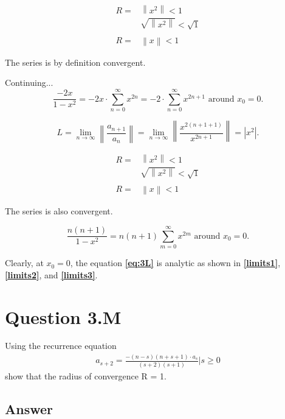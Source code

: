 \documentclass{article}
\begin{document}
\begin{align*}
R =& \left\|x^2\right\| < 1 \\
& \sqrt{\left\|x^2\right\|} < \sqrt{1}\\
\\
R =& \left\|x\right\| < 1
\end{align*}

The series is by definition convergent.

Continuing...
\begin{equation*}
\frac{-2x}{1-x^2} = -2x\cdot \sum_{n=0}^{\infty} {x^{2n}} = -2\cdot \sum_{n=0}^{\infty} {x^{2n+1}} \text{  around } x_0=0.
\end{equation*}

\begin{equation}\label{limits2}
L = \lim_{n\to\infty} \left\| \frac{a_{n+1}}{a_n} \right\| = \lim_{n\to\infty}\left\|\frac{x^{2(n+1+1)}}{x^{2n+1}}\right\| = \left|x^2\right|.
\end{equation}
    
\begin{align*}
R =& \left\|x^2\right\| < 1 \\
& \sqrt{\left\|x^2\right\|} < \sqrt{1}\\
\\
R =& \left\|x\right\| < 1
\end{align*}

The series is also convergent.

\begin{equation}\label{limits3}
\frac{n(n+1)}{1-x^2} = n(n+1) \sum_{m=0}^{\infty} x^{2m} \text{  around } x_0=0.
\end{equation}

Clearly, at $x_0 = 0$, the equation \textbf{\ref{eq:3L}} is analytic as shown in \textbf{\ref{limits1}}, \textbf{\ref{limits2}}, and \textbf{\ref{limits3}}.

\section*{Question 3.M}
Using the recurrence equation
\begin{align}\label{3M}
a_{s+2} = \frac{-(n-s)(n+s+1)\cdot{a_s}}{(s+2)(s+1)}\Bigr|
s\geq0
\end{align}
show that the radius of convergence R = 1.

\subsection*{Answer}
\end{document}
